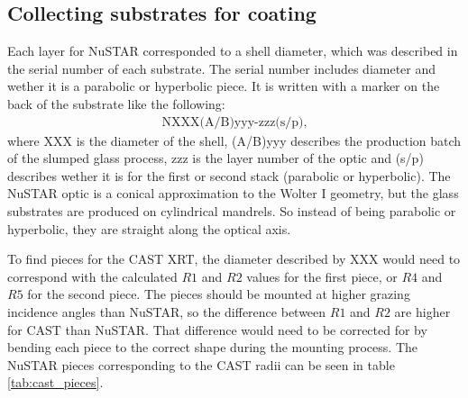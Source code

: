\subsection{Collecting substrates for coating}
Each layer for NuSTAR corresponded to a shell diameter, which was described in the serial number of each substrate. The serial number includes diameter and wether it is a parabolic or hyperbolic piece. It is written with a marker on the back of the substrate like the following:
\begin{eqnarray}
  \text{NXXX(A/B)yyy-zzz(s/p),}\nonumber
\end{eqnarray}
where XXX is the diameter of the shell, (A/B)yyy describes the production batch of the slumped glass process, zzz is the layer number of the optic and (s/p) describes wether it is for the first or second stack (parabolic or hyperbolic). The NuSTAR optic is a conical approximation to the Wolter I geometry, but the glass substrates are produced on cylindrical mandrels. So instead of being parabolic or hyperbolic, they are straight along the optical axis.

To find pieces for the CAST XRT, the diameter described by XXX would need to correspond with the calculated $\mathit{R1}$ and $\mathit{R2}$ values for the first piece, or $\mathit{R4}$ and $\mathit{R5}$ for the second piece. The pieces should be mounted at higher grazing incidence angles than NuSTAR, so the difference between $\mathit{R1}$ and $\mathit{R2}$ are higher for CAST than NuSTAR. That difference would need to be corrected for by bending each piece to the correct shape during the mounting process. The NuSTAR pieces corresponding to the CAST radii can be seen in table \ref{tab:cast_pieces}.


